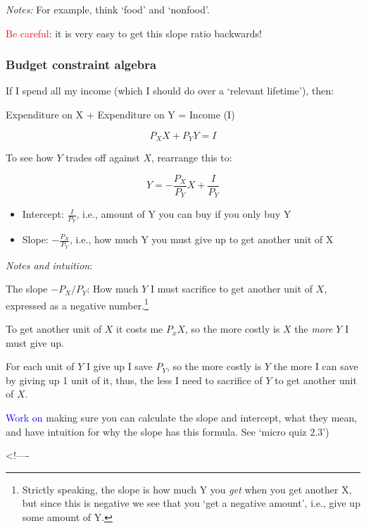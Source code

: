\documentclass[]{article}
\providecommand{\tightlist}{%
  \setlength{\itemsep}{0pt}\setlength{\parskip}{0pt}}
\begin{document}
\emph{Notes:} For example, think `food' and `nonfood'.

\textcolor{red}{Be careful}: it is very easy to get this slope ratio
backwards!

\hypertarget{budget-constraint-algebra}{%
\subsubsection{Budget constraint
algebra}\label{budget-constraint-algebra}}

If I spend all my income (which I should do over a `relevant lifetime'),
then:

Expenditure on X + Expenditure on Y = Income (I)

\[P_X X + P_Y Y = I \]

\bigskip

To see how \(Y\) trades off against \(X\), rearrange this to:

\[Y = -\frac{P_X}{P_Y} X + \frac{I}{P_Y}\]

\begin{itemize}
\tightlist
\item
  Intercept: \(\frac{I}{P_Y}\), i.e., amount of Y you can buy if you
  only buy Y
\item
  Slope: \(-\frac{P_X}{P_Y}\), i.e., how much Y you must give up to get
  another unit of X
\end{itemize}

\medskip

\emph{Notes and intuition}:

The slope \(-P_X/P_Y\): How much \(Y\) I must sacrifice to get another
unit of \(X\), expressed as a negative number.\footnote{Strictly
  speaking, the slope is how much Y you \emph{get} when you get another
  X, but since this is negative we see that you `get a negative amount',
  i.e., give up some amount of Y.}

To get another unit of \(X\) it costs me \(P_xX\), so the more costly is
\(X\) the \emph{more} \(Y\) I must give up.

For each unit of \(Y\) I give up I save \(P_Y\), so the more costly is
\(Y\) the more I can save by giving up 1 unit of it, thus, the less I
need to sacrifice of \(Y\) to get another unit of \(X\).

\textcolor{blue}{Work on} making sure you can calculate the slope and
intercept, what they mean, and have intuition for why the slope has this
formula. See `micro quiz 2.3')

\textless!----
\end{document}
